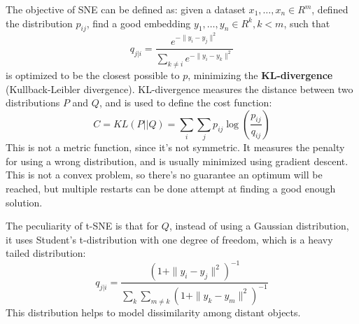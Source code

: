 The objective of SNE can be defined as: given a dataset $x_1, \dots, x_n \in R^m$, defined the distribution $p_{ij}$, find a good embedding $y_1, \dots, y_n \in R^k, k < m$, such that
\begin{equation*}
    q_{j|i} = \dfrac{e^{-\|y_i - y_j\|^2}}{\sum_{k \neq i} e^{-\|y_i - y_k\|^2}}
\end{equation*}
is optimized to be the closest possible to $p$, minimizing the \textbf{KL-divergence} (Kullback-Leibler divergence). KL-divergence measures the distance between two distributions $P$ and $Q$, and is used to define the cost function:
\begin{equation*}
    C = KL(P || Q) = \sum_i \sum_j p_{ij} \log(\frac{p_{ij}}{q_{ij}})
\end{equation*}
This is not a metric function, since it's not symmetric. It measures the penalty for using a wrong distribution, and is usually minimized using gradient descent. This is not a convex problem, so there's no guarantee an optimum will be reached, but multiple restarts can be done attempt at finding a good enough solution.

The peculiarity of t-SNE is that for $Q$, instead of using a Gaussian distribution, it uses Student's t-distribution with one degree of freedom, which is a heavy tailed distribution:
\begin{equation*}
    q_{j|i} = \dfrac{(1 + \|y_i - y_j\|^2)^{-1}}{\sum_k \sum_{m \neq k} (1 + \|y_k - y_m\|^2)^{-1}}
\end{equation*}
This distribution helps to model dissimilarity among distant objects.

